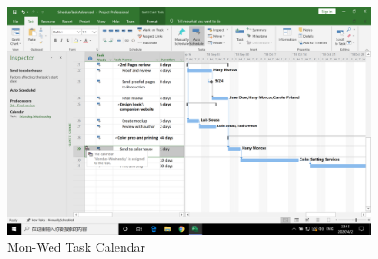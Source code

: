 \documentclass[11pt]{article}
\begin{document}
\begin{figure}[H]
    \centering
    \includegraphics[width=0.95\textwidth]{calendar}
    \caption{Mon-Wed Task Calendar}
\end{figure}
\end{document}
